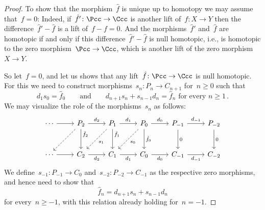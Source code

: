 \begin{proof}
  To show that the morphism~$\hat{f}$ is unique up to homotopy we may assume that~$f = 0$:
  Indeed, if~$\hat{f}' \colon \Pcc \to \Ccc$ is another lift of~$f \colon X \to Y$ then the difference~$\hat{f}' - \hat{f}$ is a lift of~$f - f = 0$.
  And the morphisms~$\hat{f}'$ and~$\hat{f}$ are homotopic if and only if this difference~$\hat{f}' - \hat{f}$ is null homotopic, i.e., is homotopic to the zero morphism~$\Pcc \to \Ccc$, which is another lift of the zero morphism~$X \to Y$.
  
  So let~$f = 0$, and let us shows that any lift~$\hat{f} \colon \Pcc \to \Ccc$ is null homotopic.
  For this we need to construct morphisms~$s_n \colon P_n \to C_{n+1}$ for~$n \geq 0$ such that
  \[
    d_1 s_0 = \hat{f}_0
    \qquad\text{and}\qquad
    \text{$d_{n+1} s_n + s_{n-1} d_n = \hat{f}_n$ for every~$n \geq 1$} \,.
  \]
  We may visualize the role of the morphisms~$s_n$ as follows:
  \[
    \begin{tikzcd}[row sep = large]
        \dotsb
        \arrow{r}
      & P_2
        \arrow{r}[above]{d_2}
        \arrow{d}[right, near start]{\hat{f}_2}
        \arrow[dashed]{dl}
      & P_1
        \arrow{r}[above]{d_1}
        \arrow{d}[right, near start]{\hat{f}_1}
        \arrow[dashed]{dl}[below right]{s_1}
      & P_0
        \arrow{r}[above]{d_0}
        \arrow{d}[right]{\hat{f}_0}
        \arrow[dashed]{dl}[below right]{s_0}
      & P_{-1}
        \arrow{r}{d_{-1}}
        \arrow{d}[right]{0}
      & P_{-2}
        \arrow{d}[right]{0}
      \\
        \dotsb
        \arrow{r}
      & C_2
        \arrow{r}[below]{d_2}
      & C_1
        \arrow{r}[below]{d_1}
      & C_0
        \arrow{r}[below]{d_0}
      & C_{-1}
        \arrow{r}[below]{d_{-1}}
      & C_{-2}
    \end{tikzcd}
  \]
  We define~$s_{-1} \colon P_{-1} \to C_0$ and~$s_{-2} \colon P_{-2} \to C_{-1}$ as the respective zero morphisms, and hence need to show that
  \[
      \hat{f}_n
    = d_{n+1} s_n + s_{n-1} d_n
  \]
  for every~$n \geq -1$, with this relation already holding for~$n = -1$.
  

\end{proof}
